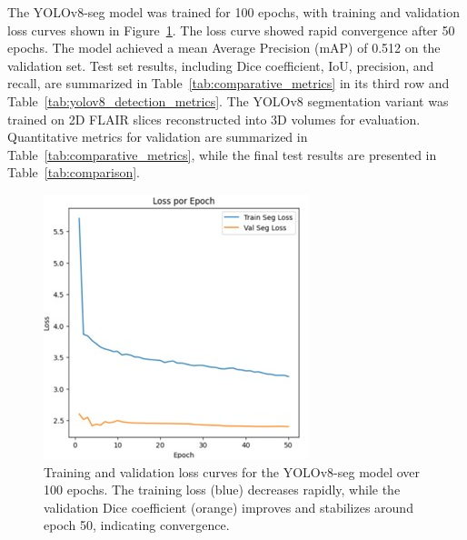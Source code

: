 \documentclass[12pt]{article}
\begin{document}

The YOLOv8-seg model was trained for 100 epochs, with training and validation loss curves shown in Figure~\ref{fig:yolov8_loss_curve}. The loss curve showed rapid convergence after 50 epochs. The model achieved a mean Average Precision (mAP) of 0.512 on the validation set. Test set results, including Dice coefficient, IoU, precision, and recall, are summarized in Table~\ref{tab:comparative_metrics} in its third row and Table~\ref{tab:yolov8_detection_metrics}. The YOLOv8 segmentation variant was trained on 2D FLAIR slices reconstructed into 3D volumes for evaluation. Quantitative metrics for validation are summarized in Table~\ref{tab:comparative_metrics}, while the final test results are presented in Table~\ref{tab:comparison}.


\begin{figure}[tp]
    \centering
    \includegraphics[width=.7\textwidth]{figures/Figure 5.jpg}
    \caption{Training and validation loss curves for the YOLOv8-seg model over 100 epochs. The training loss (blue) decreases rapidly, while the validation Dice coefficient (orange) improves and stabilizes around epoch 50, indicating convergence.}\label{fig:yolov8_loss_curve}
\end{figure}

\end{document}
